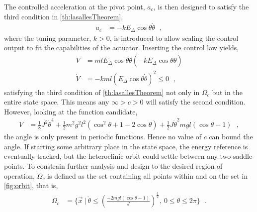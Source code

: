 %
The controlled acceleration at the pivot point, $a_c$, is then designed to satisfy the third condition in \autoref{th:lasallesTheorem},
\begin{align}
  a_c &= -k E_\Delta \cos \theta \dot{\theta}  \ \ \ ,  \label{eq:accControlLaw}
\end{align}
where the tuning parameter, $k>0$, is introduced to allow scaling the control output to fit the capabilities of the actuator. Inserting the control law yields,
\begin{align}
  \dot{V} &= m l E_\Delta \cos \theta \dot{\theta} (-k E_\Delta \cos \theta \dot{\theta})     \label{eq:lyapunovDerivativeControlled1} \\
  \dot{V} &= -k m l (E_\Delta \cos \theta \dot{\theta})^2  \leq 0  \ \ \ ,   \label{eq:lyapunovDerivativeControlled2} 
\end{align}
satisfying the third condition of \autoref{th:lasallesTheorem} not only in $\Omega_c$ but in the entire state space. This means any $\infty>c>0$ will satisfy the second condition. However, looking at the function candidate,
\begin{align}
V &= \tfrac{1}{8} J^2 \dot{\theta}^4 + \tfrac{1}{2} m^2 g^2 l^2 ( \cos^2 \theta + 1 -2\cos \theta )  +  \tfrac{1}{2} J \dot{\theta}^2  m g l (\cos \theta -1)  \ \ \ , \label{eq:functionCandidate3}
\end{align}
the angle is only present in periodic functions. Hence no value of $c$ can bound the angle. If starting some arbitrary place in the state space, the energy reference is eventually tracked, but the heteroclinic orbit could settle between any two saddle points. To constrain further analysis and design to the desired region of operation, $\Omega_c$ is defined as the set containing all points within and on the set in \autoref{fig:orbit}, that is,
\begin{align}
  \Omega_c &=  \{ \vec{x} \ | \ \dot{\theta} \leq \left(\frac{-2 m g l (\cos \theta -1)}{J}\right)^{\tfrac{1}{2}} , \ 0 \leq \theta \leq 2 \pi  \} \ \ \ . \label{eq:omegaC}
\end{align}
%
